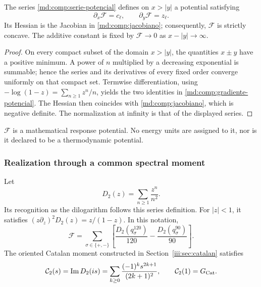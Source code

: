 \begin{proposition}
\label{md:comp:prop-potencial}
The series \eqref{md:comp:serie-potencial} defines on \(x>|y|\) a
potential satisfying
\begin{equation}
 \boxed{\partial_x\mathscr F=c_\ell,\qquad
        \partial_y\mathscr F=z_\ell.}
 \label{md:comp:gradiente-potencial}
\end{equation}
Its Hessian is the Jacobian in
\eqref{md:comp:jacobiano}; consequently, \(\mathscr F\) is
strictly concave. The additive constant is fixed by
\(\mathscr F\longrightarrow0\) as \(x-|y|\longrightarrow\infty\).
\end{proposition}
\begin{proof}
On every compact subset of the domain \(x>|y|\), the quantities
\(x\pm y\) have a positive minimum. A power of \(n\) multiplied by
a decreasing exponential is summable; hence the series and its
derivatives of every fixed order converge uniformly on that compact set.
Termwise differentiation, using
\(-\log(1-z)=\sum_{n\geq1}z^n/n\), yields the two identities in
\eqref{md:comp:gradiente-potencial}. The Hessian then coincides with
\eqref{md:comp:jacobiano}, which is negative definite.
The normalization at infinity is that of the displayed series.
\end{proof}

\(\mathscr F\) is a mathematical response potential. No energy units
are assigned to it, nor is it declared to be a thermodynamic potential.

\subsubsection{Realization through a common spectral moment}
\label{md:comp:momento-espectral}

Let
\[
 D_2(z)=\sum_{n\geq1}\frac{z^n}{n^2}.
\]
Its recognition as the dilogarithm follows this series definition.
For \(|z|<1\), it satisfies
\((z\partial_z)^2D_2(z)=z/(1-z)\). In this notation,
\begin{equation}
 \mathscr F=
 \sum_{\sigma\in\{+,-\}}
 \left[\frac{D_2(q_\sigma^{120})}{120}
       -\frac{D_2(q_\sigma^{90})}{90}\right].
 \label{md:comp:potencial-dos-momentos}
\end{equation}
The oriented Catalan moment constructed in
Section~\ref{iii:sec:catalan} satisfies
\begin{equation}
 \mathcal C_2(s)=\operatorname{Im}D_2(is)
 =\sum_{k\geq0}\frac{(-1)^ks^{2k+1}}{(2k+1)^2},\qquad
 \mathcal C_2(1)=G_{\rm Cat}.
 \label{md:comp:catalan-momento}
\end{equation}

